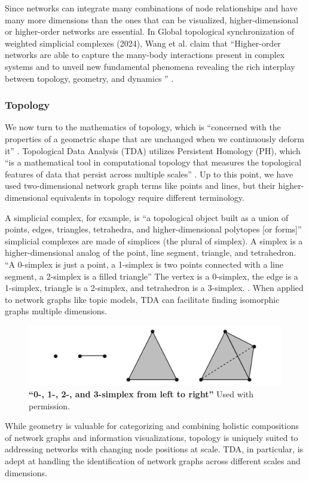 Since networks can integrate many combinations of node relationships and have many more dimensions than the ones that can be visualized, higher-dimensional or higher-order networks are essential. In Global topological synchronization of weighted simplicial complexes (2024), Wang et al. claim that  “Higher-order networks are able to capture the many-body interactions present in complex systems and to unveil new fundamental phenomena revealing the rich interplay between topology, geometry, and dynamics ” \citep[p.1]{wang_global_2024}.  


\subsubsection{Topology}
We now turn to the mathematics of topology, which is “concerned with the properties of a geometric shape that are unchanged when we continuously deform it” \citep[p. 383]{totaro_iv6_2008}. Topological Data Analysis (TDA) utilizes Persistent Homology (PH), which “is a mathematical tool in computational topology that measures the topological features of data that persist across multiple scales” \citep[p. 1]{aktas_persistence_2019}. Up to this point, we have used two-dimensional network graph terms like points and lines, but their higher-dimensional equivalents in topology require different terminology.

A simplicial complex, for example, is “a topological object built as a union of points, edges, triangles, tetrahedra, and higher-dimensional polytopes [or forms]” simplicial complexes are made of simplices (the plural of simplex). A simplex is a higher-dimensional analog of the point, line segment, triangle, and tetrahedron. “A 0-simplex is just a point, a 1-simplex is two points connected with a line segment, a 2-simplex is a filled triangle” The vertex is a 0-simplex, the edge is a 1-simplex, triangle is a 2-simplex, and tetrahedron is a 3-simplex. \citep[p. 4]{aktas_persistence_2019}. When applied to network graphs like topic models, TDA can facilitate finding isomorphic graphs multiple dimensions.


\begin{figure}[h]
    \centering
    \includegraphics[width=0.5\linewidth]{figures/f9.png}
    \caption[0-, 1-, 2-, and 3-simplex from left to right]{ \textbf{“0-, 1-, 2-, and 3-simplex from left to right”} 
\citep[p. 4]{aktas_persistence_2019} Used with permission.}
    \label{f9}
\end{figure}
\par
While geometry is valuable for categorizing and combining holistic compositions of network graphs and information visualizations, topology is uniquely suited to addressing networks with changing node positions at scale. TDA, in particular, is adept at handling the identification of network graphs across different scales and dimensions.


